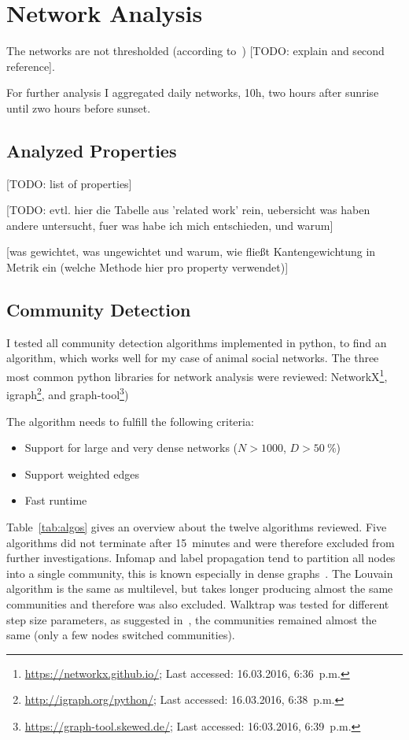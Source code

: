 \section{Network Analysis}
The networks are not thresholded (according to~\cite{farine2015constructing}) [TODO: explain and second reference].

For further analysis I aggregated daily networks, 10h, two hours after sunrise until zwo hours before sunset.



\subsection{Analyzed Properties}
[TODO: list of properties]

[TODO: evtl. hier die Tabelle aus 'related work' rein, uebersicht was haben andere untersucht, fuer was habe ich mich entschieden, und warum]

[was gewichtet, was ungewichtet und warum, wie fließt Kantengewichtung in Metrik ein (welche Methode hier pro property verwendet)]

\subsection{Community Detection}
I tested all community detection algorithms implemented in python, to find an algorithm, which works well for my case of animal social networks. The three most common python libraries for network analysis were reviewed: NetworkX\footnote{\url{https://networkx.github.io/}; Last accessed: 16.03.2016, 6:36~p.m.}, igraph\footnote{\url{http://igraph.org/python/}; Last accessed: 16.03.2016, 6:38~p.m.}, and graph-tool\footnote{\url{https://graph-tool.skewed.de/}; Last accessed: 16:03.2016, 6:39~p.m.})

The algorithm needs to fulfill the following criteria:

\begin{itemize}
\item Support for large and very dense networks ($N>1000$, $D>50~\%$)
\item Support weighted edges
\item Fast runtime
\end{itemize}

Table~\ref{tab:algos} gives an overview about the twelve algorithms reviewed. Five algorithms did not terminate after 15~minutes and were therefore excluded from further investigations. Infomap and label propagation tend to partition all nodes into a single community, this is known especially in dense graphs~\cite{yang2016comparative, fortunato2010community}.
The Louvain algorithm is the same as multilevel, but takes longer producing almost the same communities and therefore was also excluded. Walktrap was tested for different step size parameters, as suggested in~\cite{pons2005computing}, the communities remained almost the same (only a few nodes switched communities). 

